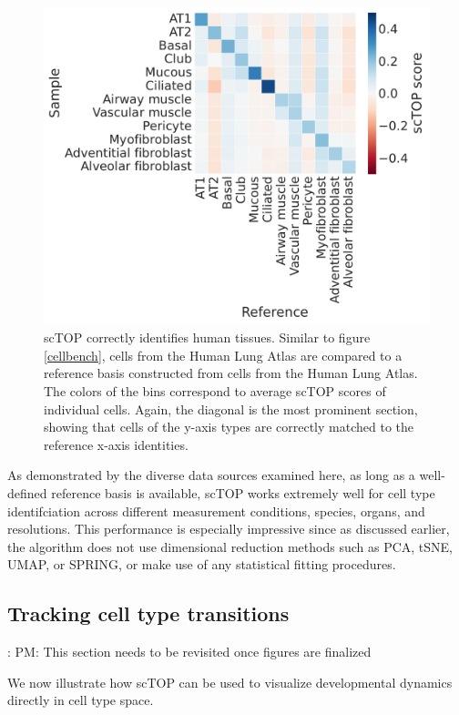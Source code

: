 \documentclass[aps,superscriptaddress, notitlepage,longbibliography]{revtex4-1}
\begin{document}
\begin{figure}
	\centering
		\includegraphics[scale=0.5]{figs/human lung heatmap.pdf}
	\caption{scTOP correctly identifies human tissues. Similar to figure \ref{cellbench}, cells from the Human Lung Atlas are compared to a reference basis constructed from cells from the Human Lung Atlas. The colors of the bins correspond to average scTOP scores of individual cells. Again, the diagonal is the most prominent section, showing that cells of the y-axis types are correctly matched to the reference x-axis identities.}
	\label{human lung}
\end{figure}

As demonstrated by the diverse data sources examined here, as long as a well-defined reference basis is available, scTOP works extremely well  for cell type identifciation across different measurement conditions, species, organs, and resolutions. This performance is especially impressive since as discussed earlier, the algorithm does not use dimensional reduction methods such as PCA, tSNE, UMAP, or SPRING, or make use of any statistical fitting procedures.

\subsection{Tracking cell type transitions}

{\color{red}: PM: This section needs to be revisited once figures are finalized}

We now illustrate how scTOP can be used to visualize developmental dynamics directly in cell type space. 
\end{document}
